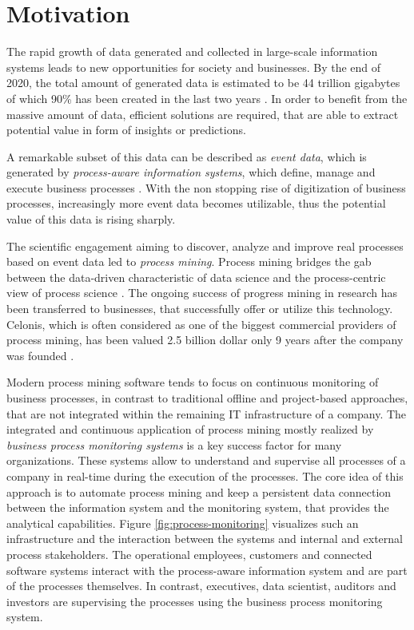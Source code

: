 
\section{Motivation}

The rapid growth of data generated and collected in large-scale information systems leads to new opportunities for  society and businesses. 
By the end of 2020, the total amount of generated data is estimated to be 44 trillion gigabytes of which 90\% has been created in the last two years \cite{datagrowth}.
In order to benefit from the massive amount of data, efficient solutions are required, that are able to extract potential value in form of insights or predictions.

A remarkable subset of this data can be described as \textit{event data}, which is generated by \textit{process-aware information systems}, which define, manage and execute business processes \cite{DBLP:journals/topnoc/Aalst09}.
With the non stopping rise of digitization of business processes, increasingly more event data becomes utilizable, thus the potential value of this data is rising sharply.

The scientific engagement aiming to discover, analyze and improve real processes based on event data led to \textit{process mining}. Process mining bridges the gab between the data-driven characteristic of data science and the process-centric view of process science  \cite{DBLP:books/sp/Aalst16}.
The ongoing success of progress mining in research has been transferred to businesses, that successfully offer or utilize this technology.
Celonis, which is often considered as one of the biggest commercial providers of process mining, has been valued 2.5 billion dollar only 9 years after the company was founded \cite{celonis}.

Modern process mining software tends to focus on continuous monitoring of business processes, in contrast to traditional offline and project-based approaches, that are not integrated within the remaining IT infrastructure of a company.
The integrated and continuous application of process mining mostly realized by \textit{business process monitoring systems} is a key success factor for many organizations.
These systems allow to understand and supervise all processes of a company in real-time during the execution of the processes.
The core idea of this approach is to automate process mining and keep a persistent data connection between the information system and the monitoring system, that provides the analytical capabilities.
Figure \ref{fig:process-monitoring} visualizes such an infrastructure and the interaction between the systems and internal and external process stakeholders.
The operational employees, customers and connected software systems interact with the process-aware information system and are part of the processes themselves.
In contrast, executives, data scientist, auditors and investors are supervising the processes using the business process monitoring system.

